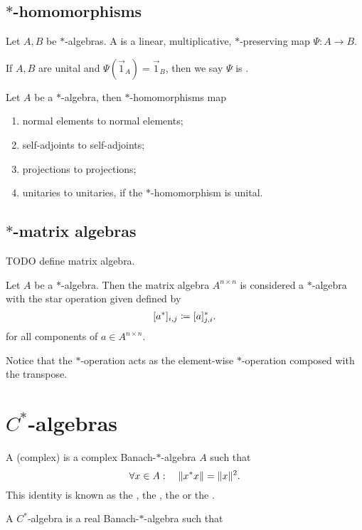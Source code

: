 \subsection{$*$-homomorphisms}
\begin{definition}
Let $A,B$ be $*$-algebras. A  is a linear, multiplicative, $*$-preserving map $\Psi: A \to B$.

If $A,B$ are unital and $\Psi(\vec{1}_A) = \vec{1}_B$, then we say $\Psi$ is .
\end{definition}
\begin{lemma}
Let $A$ be a $*$-algebra, then $*$-homomorphisms map
\begin{enumerate}
\item normal elements to normal elements;
\item self-adjoints to self-adjoints;
\item projections to projections;
\item unitaries to unitaries, if the $*$-homomorphism is unital.
\end{enumerate}
\end{lemma}

\subsection{$*$-matrix algebras}
TODO define matrix algebra.
\begin{definition}
Let $A$ be a $*$-algebra. Then the matrix algebra $A^{n\times n}$ is considered a $*$-algebra with the star operation given defined by
\[ [a^*]_{i,j} \coloneqq [a]_{j,i}^*. \]
for all components of $a\in A^{n\times n}$.
\end{definition}
Notice that the $*$-operation acts as the element-wise $*$-operation composed with the transpose.
\section{$C^*$-algebras}
\begin{definition}
A (complex)  is a complex Banach-$*$-algebra $A$ such that
\[\forall x\in A: \quad \lVert x^*x\rVert = \lVert x\rVert^2.\]
This identity is known as the , the , the  or the .
\end{definition}

\begin{definition}
A  $C^*$-algebra is a real Banach-$*$-algebra such that 
\end{definition}

